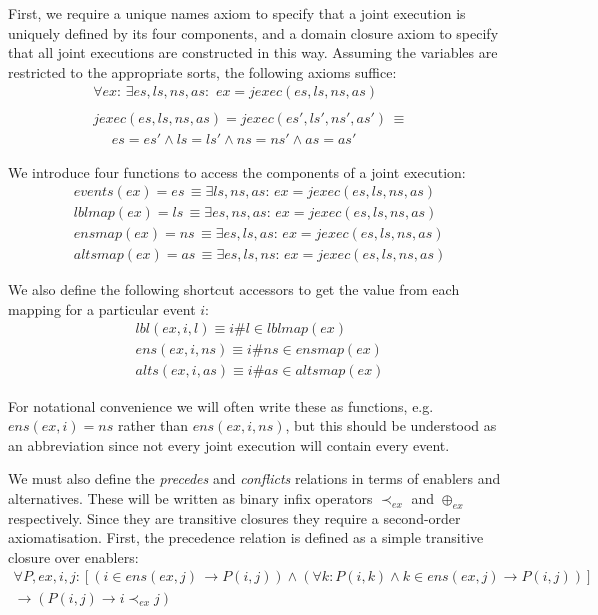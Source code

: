 First, we require a unique names axiom to specify that a joint execution
is uniquely defined by its four components, and a domain closure axiom
to specify that all joint executions are constructed in this way.
Assuming the variables are restricted to the appropriate sorts, the
following axioms suffice:\begin{gather*}
\forall ex:\,\exists es,ls,ns,as:\,\, ex=jexec(es,ls,ns,as)\\
\\jexec(es,ls,ns,as)=jexec(es',ls',ns',as')\,\equiv\,\,\,\,\,\,\,\,\\
\,\,\,\,\,\,\,\, es=es'\wedge ls=ls'\wedge ns=ns'\wedge as=as'\end{gather*}


We introduce four functions to access the components of a joint execution:\begin{gather*}
events(ex)=es\,\equiv\exists ls,ns,as:\, ex=jexec(es,ls,ns,as)\\
lblmap(ex)=ls\,\equiv\exists es,ns,as:\, ex=jexec(es,ls,ns,as)\\
ensmap(ex)=ns\,\equiv\exists es,ls,as:\, ex=jexec(es,ls,ns,as)\\
altsmap(ex)=as\,\equiv\exists es,ls,ns:\, ex=jexec(es,ls,ns,as)\end{gather*}


We also define the following shortcut accessors to get the value from
each mapping for a particular event $i$:\begin{gather*}
lbl(ex,i,l)\equiv i\#l\in lblmap(ex)\\
ens(ex,i,ns)\equiv i\#ns\in ensmap(ex)\\
alts(ex,i,as)\equiv i\#as\in altsmap(ex)\end{gather*}


For notational convenience we will often write these as functions,
e.g. $ens(ex,i)=ns$ rather than $ens(ex,i,ns)$, but this should
be understood as an abbreviation since not every joint execution will
contain every event.

We must also define the \emph{precedes} and \emph{conflicts} relations
in terms of enablers and alternatives. These will be written as binary
infix operators $\prec_{ex}$ and $\oplus_{ex}$ respectively. Since
they are transitive closures they require a second-order axiomatisation.
First, the precedence relation is defined as a simple transitive closure
over enablers:\begin{multline*}
\forall P,ex,i,j:\left[\left(i\in ens(ex,j)\,\rightarrow P(i,j)\right)\wedge\left(\forall k:P(i,k)\wedge k\in ens(ex,j)\rightarrow P(i,j)\right)\right]\\
\rightarrow\left(P(i,j)\rightarrow i\prec_{ex}j\right)\end{multline*}



